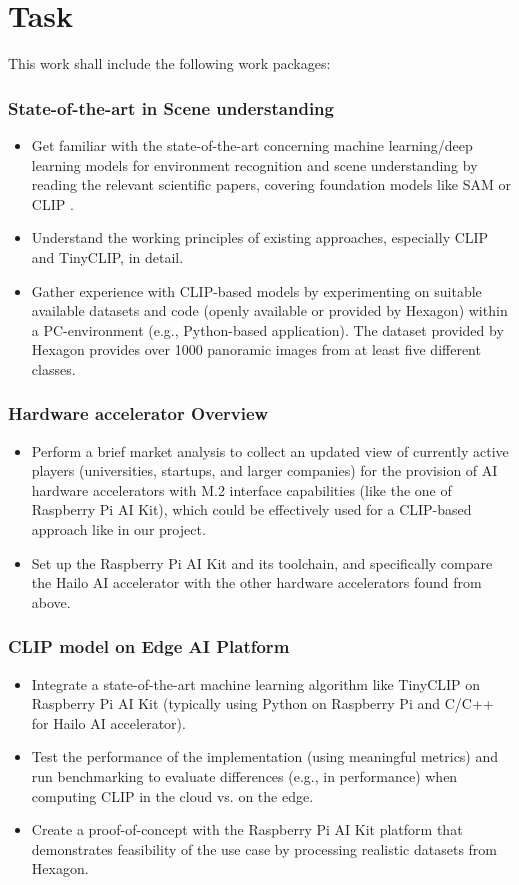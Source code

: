 \chapter{Task}
This work shall include the following work packages:
\subsection*{State-of-the-art in Scene understanding}
\begin{itemize}
    \item Get familiar with the state-of-the-art concerning machine learning/deep learning models for environment recognition and scene understanding by reading the relevant scientific papers, covering foundation models like SAM\cite{sam} or CLIP \cite{clip}.
    \item Understand the working principles of existing approaches, especially CLIP and TinyCLIP\cite{tinyclip}, in detail.
    \item Gather experience with CLIP-based models by experimenting on suitable available datasets and code (openly available or provided by Hexagon) within a PC-environment (e.g., Python-based application). The dataset provided by Hexagon provides over 1000 panoramic images from at least five different classes.
\end{itemize}

\subsection*{Hardware accelerator Overview}
\begin{itemize}
    \item Perform a brief market analysis to collect an updated view of currently active players (universities, startups, and larger companies) for the provision of AI hardware accelerators with M.2 interface capabilities (like the one of Raspberry Pi AI Kit), which could be effectively used for a CLIP-based approach like in our project.
    \item Set up the Raspberry Pi AI Kit and its toolchain, and specifically compare the Hailo AI accelerator with the other hardware accelerators found from above.
\end{itemize}

\subsection*{CLIP model on Edge AI Platform}
\begin{itemize}
    \item Integrate a state-of-the-art machine learning algorithm like TinyCLIP on Raspberry Pi AI Kit (typically using Python on Raspberry Pi and C/C++ for Hailo AI accelerator).
    \item Test the performance of the implementation (using meaningful metrics) and run benchmarking to evaluate differences (e.g., in performance) when computing CLIP in the cloud vs. on the edge.
    \item Create a proof-of-concept with the Raspberry Pi AI Kit platform that demonstrates feasibility of the use case by processing realistic datasets from Hexagon.
\end{itemize}

